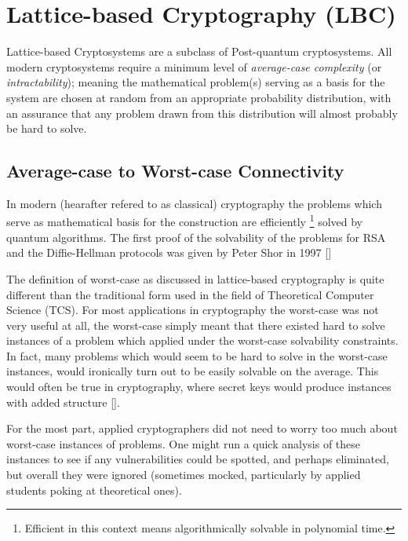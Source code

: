 \section{Lattice-based Cryptography (LBC)} 


Lattice-based Cryptosystems are a subclass of Post-quantum cryptosystems. All modern cryptosystems require a minimum level of \emph{average-case complexity} (or \emph{intractability}); meaning the mathematical problem(s) serving as a basis for the system are chosen at random from an appropriate probability distribution, with an assurance that any problem drawn from this distribution will almost probably  be hard to solve. 




 

\subsection{Average-case to Worst-case Connectivity}

In modern (hearafter refered to as classical) cryptography the problems which serve as mathematical basis for the construction are efficiently \footnote{Efficient in this context means algorithmically solvable in polynomial time.} solved by quantum algorithms. The first proof of the solvability of the problems for RSA and the Diffie-Hellman protocols was given by Peter Shor in 1997 [\cite{Sho19970}] 

The definition of worst-case as discussed in lattice-based cryptography is quite different than the traditional form used in the field of Theoretical Computer Science (TCS). For most applications in cryptography the worst-case was not very useful at all, the worst-case simply meant that there existed hard to solve instances of a problem which applied under the worst-case solvability constraints. In fact, many problems which would seem to be hard to solve in the worst-case instances, would ironically turn out to be easily solvable on the average. This would often be true in cryptography, where secret keys would produce instances with added structure [\cite{Pei20151}].  


For the most part, applied cryptographers did not need to worry too much about worst-case instances of problems. One might run a quick analysis of these instances to see if any vulnerabilities could be spotted, and perhaps eliminated, but overall they were ignored (sometimes mocked, particularly by applied students poking at theoretical ones). 
